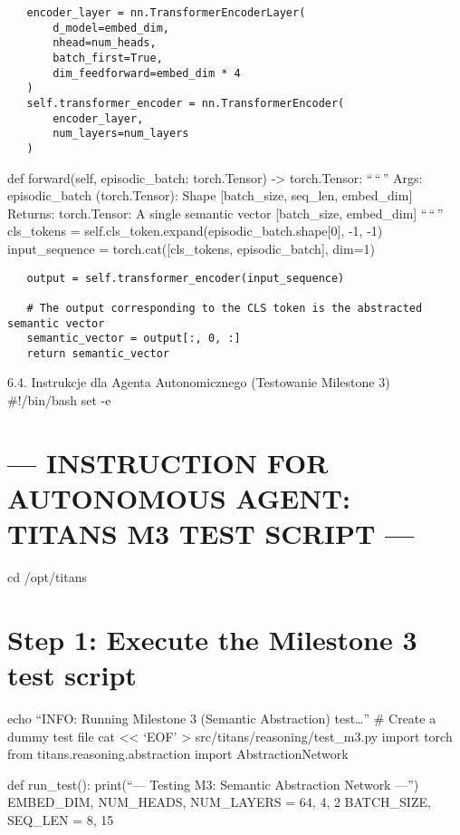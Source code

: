 \documentclass[letterpaper,twocolumn]{article}
\begin{document}
\begin{verbatim}
   encoder_layer = nn.TransformerEncoderLayer(
       d_model=embed_dim, 
       nhead=num_heads, 
       batch_first=True,
       dim_feedforward=embed_dim * 4
   )
   self.transformer_encoder = nn.TransformerEncoder(
       encoder_layer, 
       num_layers=num_layers
   )
\end{verbatim}

def forward(self, episodic\_batch: torch.Tensor) -\textgreater{}
torch.Tensor: ``\,``\,'' Args: episodic\_batch (torch.Tensor): Shape
{[}batch\_size, seq\_len, embed\_dim{]} Returns: torch.Tensor: A single
semantic vector {[}batch\_size, embed\_dim{]} ``\,``\,'' cls\_tokens =
self.cls\_token.expand(episodic\_batch.shape{[}0{]}, -1, -1)
input\_sequence = torch.cat({[}cls\_tokens, episodic\_batch{]}, dim=1)

\begin{verbatim}
   output = self.transformer_encoder(input_sequence)
   
   # The output corresponding to the CLS token is the abstracted semantic vector
   semantic_vector = output[:, 0, :]
   return semantic_vector
\end{verbatim}

6.4. Instrukcje dla Agenta Autonomicznego (Testowanie Milestone 3)
\#!/bin/bash set -e

\hypertarget{instruction-for-autonomous-agent-titans-m3-test-script}{%
\section{--- INSTRUCTION FOR AUTONOMOUS AGENT: TITANS M3 TEST SCRIPT
---}\label{instruction-for-autonomous-agent-titans-m3-test-script}}

cd /opt/titans

\hypertarget{step-1-execute-the-milestone-3-test-script}{%
\section{Step 1: Execute the Milestone 3 test
script}\label{step-1-execute-the-milestone-3-test-script}}

echo ``INFO: Running Milestone 3 (Semantic Abstraction) test\ldots{}''
\# Create a dummy test file cat \textless\textless{} `EOF'
\textgreater{} src/titans/reasoning/test\_m3.py import torch from
titans.reasoning.abstraction import AbstractionNetwork

def run\_test(): print(``--- Testing M3: Semantic Abstraction Network
---'') EMBED\_DIM, NUM\_HEADS, NUM\_LAYERS = 64, 4, 2 BATCH\_SIZE,
SEQ\_LEN = 8, 15
\end{document}
